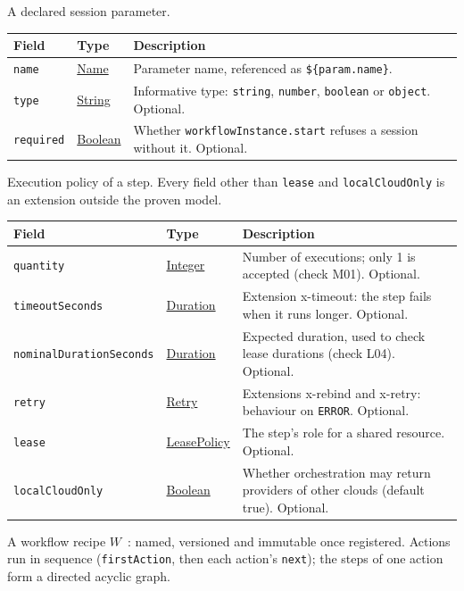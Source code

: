 \documentclass[a4paper]{arrowhead}
\newcommand{\mref}[1]{{\textcolor{ArrowheadPurple}{\hyperref[sec:model:#1]{#1}}}}
\newcommand{\pref}[1]{{\textcolor{ArrowheadGrey}{\hyperref[sec:model:primitives:#1]{#1}}}}
\begin{document}
A declared session parameter.

{\small
\begin{longtable}{|p{3.9cm}|p{4.4cm}|p{7.5cm}|}

\hline
\rowcolor{gray!33} Field & Type & Description \\ \hline
\endhead
\texttt{name} & \pref{Name} & Parameter name, referenced as \texttt{\$\{param.name\}}. \\ \hline
\texttt{type} & \pref{String} & Informative type: \texttt{string}, \texttt{number}, \texttt{boolean} or \texttt{object}. Optional. \\ \hline
\texttt{required} & \pref{Boolean} & Whether \texttt{workflow\allowbreak{}Instance.\allowbreak{}start} refuses a session without it. Optional. \\ \hline
\end{longtable}
}

Execution policy of a step. Every field other than \texttt{lease} and \texttt{local\allowbreak{}Cloud\allowbreak{}Only} is an extension outside the proven model.

{\small
\begin{longtable}{|p{3.9cm}|p{4.4cm}|p{7.5cm}|}

\hline
\rowcolor{gray!33} Field & Type & Description \\ \hline
\endhead
\texttt{quantity} & \pref{Integer} & Number of executions; only 1 is accepted (check M01). Optional. \\ \hline
\texttt{timeout\allowbreak{}Seconds} & \pref{Duration} & Extension x-timeout: the step fails when it runs longer. Optional. \\ \hline
\texttt{nominal\allowbreak{}Duration\allowbreak{}Seconds} & \pref{Duration} & Expected duration, used to check lease durations (check L04). Optional. \\ \hline
\texttt{retry} & \mref{Retry} & Extensions x-rebind and x-retry: behaviour on \texttt{ERROR}. Optional. \\ \hline
\texttt{lease} & \mref{LeasePolicy} & The step's role for a shared resource. Optional. \\ \hline
\texttt{local\allowbreak{}Cloud\allowbreak{}Only} & \pref{Boolean} & Whether orchestration may return providers of other clouds (default true). Optional. \\ \hline
\end{longtable}
}

A workflow recipe $W$~\cite{varga2026}: named, versioned and immutable once registered. Actions run in sequence (\texttt{firstAction}, then each action's \texttt{next}); the steps of one action form a directed acyclic graph.
\end{document}
